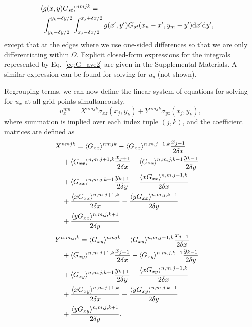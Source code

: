 \documentclass[aps,prl,reprint,twocolumn,groupedaddress,showpacs]{revtex4-1}
\def\dd{\mbox{d}}
\begin{document}
\begin{align}
\lefteqn{\langle g(x,y)G_{st} \rangle^{nmjk} =}  \nonumber\\
&\  \int_{y_k-\delta y/2}^{y_k+\delta y/2} \int_{x_j-\delta x/2}^{x_j+\delta x/2} g(x',y')G_{st}(x_n-x',y_m-y') \dd x' \dd y', \label{eq:G_ave} 
\end{align}
%
except that at the edges where we use one-sided differences so that we
are only differentiating within $\Omega$. Explicit closed-form
expressions for the integrals represented by Eq.~\ref{eq:G_ave2} are
given in the Supplemental Materials. A similar expression can be found
for solving for $u_y$ (not shown).

Regrouping terms, we can now define the linear system of equations for
solving for $u_x$ at all grid points simultaneously,
\begin{equation}
u_x^{nm} = X^{nmjk}\sigma_{xz}(x_j,y_k) + Y^{nmjk}\sigma_{yz}(x_j,y_k),
\label{eq:linearsystem1}
\end{equation}
where summation is implied over each index tuple $(j,k)$, and the
coefficient matrices are defined as
\begin{align}
\lefteqn{X^{nmjk} = \langle G_{xx} \rangle^{nmjk} -  \langle G_{xx} \rangle^{n,m,j-1,k}\frac{x_{j-1}}{2\delta x} } \nonumber\\
&\quad  + \langle G_{xx} \rangle^{n,m,j+1,k}\frac{x_{j+1}}{2\delta x} -  \langle G_{xx} \rangle^{n,m,j,k-1}\frac{y_{k-1}}{2\delta y}  \nonumber\\
&\quad + \langle G_{xx} \rangle^{n,m,j,k+1}\frac{y_{k+1}}{2\delta y} -\frac{\langle xG_{xx} \rangle^{n,m,j-1,k}}{2\delta x}  \nonumber\\
&\quad +\frac{\langle xG_{xx} \rangle^{n,m,j+1,k}}{2\delta x} - \frac{\langle yG_{xx} \rangle^{n,m,j,k-1}}{2\delta y} \nonumber\\
&\quad+\frac{\langle yG_{xx} \rangle^{n,m,j,k+1}}{2\delta y} \label{eq:linearsystemX}
\end{align}
\begin{align}
\lefteqn{ Y^{n,m,j,k} =  \langle G_{xy} \rangle^{nmjk} - \langle G_{xy} \rangle^{n,m,j-1,k}\frac{x_{j-1}}{2\delta x} } \nonumber\\
&\quad+\langle G_{xy} \rangle^{n,m,j+1,k}\frac{x_{j+1}}{2\delta x} - \langle G_{xy} \rangle^{n,m,j,k-1}\frac{y_{k-1}}{2\delta y} \nonumber\\
&\quad+\langle G_{xy} \rangle^{n,m,j,k+1}\frac{y_{k+1}}{2\delta y}  -\frac{\langle xG_{xy} \rangle^{n,m,j-1,k}}{2\delta x} \nonumber \\
&\quad +\frac{\langle xG_{xy} \rangle^{n,m,j+1,k}}{2\delta x} - \frac{\langle yG_{xy} \rangle^{n,m,j,k-1}}{2\delta y} \nonumber\\
 &\quad+\frac{\langle yG_{xy} \rangle^{n,m,j,k+1}}{2\delta y}.\label{eq:linearsystemY}
\end{align}
\end{document}
